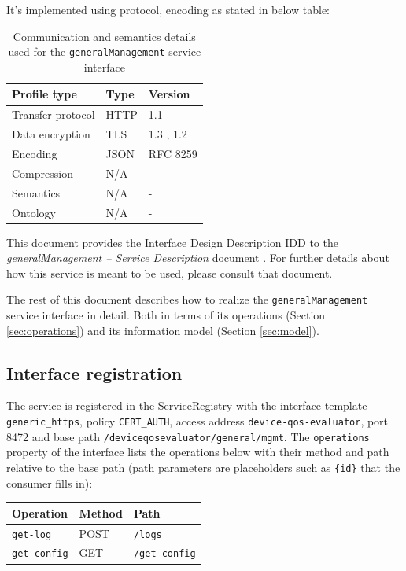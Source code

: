 \documentclass[a4paper]{arrowhead}
\begin{document}
It's implemented using protocol, encoding as stated in below table:
\begin{table}[ht!]
  \centering
  \begin{tabular}{|l|l|l|}
    \hline
    \rowcolor{gray!33} Profile type & Type & Version \\ \hline
    Transfer protocol & HTTP & 1.1 \cite{rfc9112} \\ \hline
    Data encryption & TLS & 1.3 \cite{rfc8446}, 1.2 \cite{rfc5246} \\ \hline
    Encoding & JSON & RFC 8259 \cite{rfc8259} \\ \hline
    Compression & N/A & - \\ \hline
    Semantics & N/A & - \\ \hline
    Ontology & N/A & - \\ \hline
  \end{tabular}
  \caption{Communication and semantics details used for the \texttt{generalManagement} service interface}
  \label{tab:comunication_semantics_profile}
\end{table}

This document provides the Interface Design Description IDD to the \textit{generalManagement -- Service Description} document \cite{dqe-generalManagement-sd}.
For further details about how this service is meant to be used, please consult that document.

The rest of this document describes how to realize the \texttt{generalManagement} service
interface in detail. Both in terms of its operations (Section \ref{sec:operations}) and its information model (Section \ref{sec:model}).

\subsection{Interface registration}

The service is registered in the ServiceRegistry with the interface template \texttt{generic\_\allowbreak{}https}, policy \texttt{CERT\_\allowbreak{}AUTH}, access address \texttt{device-\allowbreak{}qos-\allowbreak{}evaluator}, port 8472 and base path \texttt{/\allowbreak{}deviceqosevaluator/\allowbreak{}general/\allowbreak{}mgmt}. The \texttt{operations} property of the interface lists the operations below with their method and path relative to the base path (path parameters are placeholders such as \texttt{\{id\}} that the consumer fills in):

\noindent\begin{longtable}{| p{5.2cm} | p{1.6cm} | p{8.4cm} |} \hline
\rowcolor{gray!33} Operation & Method & Path \\ \hline \endhead
\texttt{get-\allowbreak{}log} & POST & \texttt{/\allowbreak{}logs} \\ \hline
\texttt{get-\allowbreak{}config} & GET & \texttt{/\allowbreak{}get-\allowbreak{}config} \\ \hline
\end{longtable}
\end{document}
